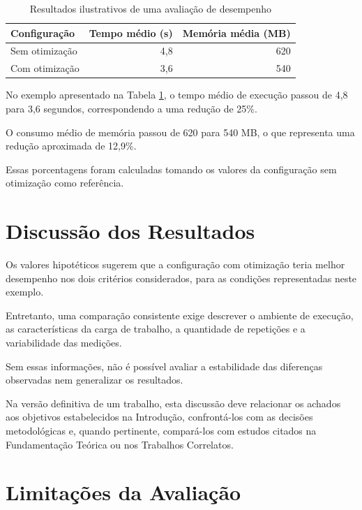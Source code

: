 \begin{table}[htb]
    \centering
    \caption{Resultados ilustrativos de uma
    avaliação de desempenho}
    \label{tab:resultados_exemplo}

    \begin{tabular}{lrr}
        \hline
        \textbf{Configuração} &
        \textbf{Tempo médio (s)} &
        \textbf{Memória média (MB)} \\
        \hline
        Sem otimização & 4,8 & 620 \\
        Com otimização & 3,6 & 540 \\
        \hline
    \end{tabular}

\end{table}

No exemplo apresentado na Tabela
\ref{tab:resultados_exemplo}, o tempo médio
de execução passou de 4,8 para 3,6 segundos, correspondendo a uma redução de 25\%.

O consumo médio de memória passou de 620 para 540 MB, o que representa uma
redução aproximada de 12,9\%.

Essas porcentagens foram calculadas tomando os valores da configuração sem otimização
como referência.

\section{Discussão dos Resultados}

Os valores hipotéticos sugerem que a configuração com otimização teria melhor
desempenho nos dois critérios considerados, para as condições representadas neste exemplo.

Entretanto, uma comparação consistente exige descrever o ambiente de execução, as
características da carga de trabalho, a quantidade de repetições e a variabilidade
das medições.

Sem essas informações, não é possível avaliar a estabilidade das diferenças
observadas nem generalizar os resultados.

Na versão definitiva de um trabalho, esta discussão deve relacionar os achados aos
objetivos estabelecidos na Introdução, confrontá-los com as decisões metodológicas
e, quando pertinente, compará-los com estudos citados na Fundamentação Teórica ou nos
Trabalhos Correlatos.

\section{Limitações da Avaliação}

